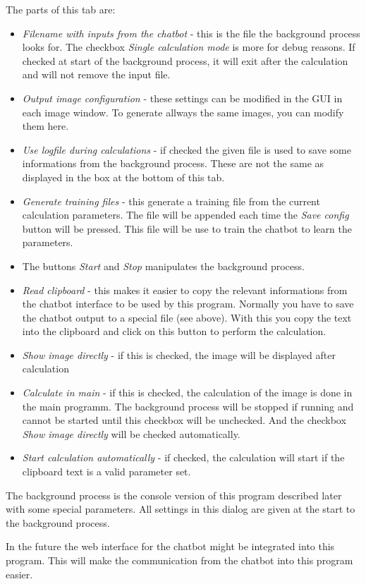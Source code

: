 \documentclass[11pt]{article} %
\begin{document}
The parts of this tab are:
\begin{itemize}\itemsep0pt
\item {\it Filename with inputs from the chatbot} - this is the file the background process looks for. The checkbox {\it Single calculation mode} is more for debug reasons. If checked at start of the background process, it will exit after the calculation and will  not remove the input file.
\item {\it Output image configuration} - these settings can be modified in the GUI in each image window. To generate allways the same images, you can modify them here.
\item {\it Use logfile during calculations} - if checked the given file is used to save some informations from the background process. These are not the same as displayed in the box at the bottom of this tab.
\item {\it Generate training files} - this generate a training file from the current calculation parameters. The file will be appended each time the {\it Save config} button will be pressed. This file will be use to train the chatbot to learn the parameters.
\item The buttons {\it Start} and {\it Stop} manipulates the background process.
\item {\it Read clipboard} - this makes it easier to copy the relevant informations from the chatbot interface to be used by this program. Normally you have to save the chatbot output to a special file (see above). With this you copy the text into the clipboard and click on this button to perform the calculation.
\item {\it Show image directly} - if this is checked, the image will be displayed after calculation
\item {\it Calculate in main} - if this is checked, the calculation of the image is done in the main programm. The background process will be stopped if running and cannot be started until this checkbox will be unchecked. And the checkbox {\it Show image directly} will be checked automatically.
\item {\it Start calculation automatically} - if checked, the calculation will start if the clipboard text is a valid parameter set.
\end{itemize}
The background process is the console version of this program described later with some special parameters. All settings in this dialog are given at the start to the background process.

In the future the web interface for the chatbot might be integrated into this program. This will make the communication from the chatbot into this program easier.
\end{document}
